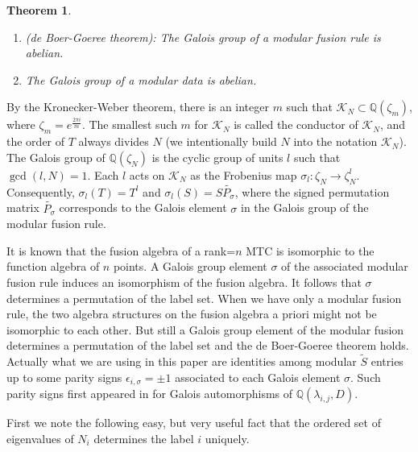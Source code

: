 \documentclass[12pt,psamsfonts]{amsart}
\newcommand{\Q}{\mathbb Q}
\newcommand{\mK}{\mathcal{K}}
\newcommand{\tS}{\tilde{S}}
\numberwithin{equation}{section}
\newtheorem{theorem}{Theorem}[section]
\theoremstyle{definition}
\begin{document}
\begin{theorem}\label{deboergoereetheorem}

\begin{enumerate}
\item (de Boer-Goeree theorem): The Galois group of a modular
fusion rule is abelian.

\item The Galois group of a modular data is abelian.
\end{enumerate}
\end{theorem}

By the Kronecker-Weber theorem, there is an integer $m$ such that
$\mK_N\subset \Q(\zeta_m)$, where $\zeta_m=e^{\frac{2\pi i}{m}}$.
The smallest such $m$ for $\mK_N$ is called the conductor of
$\mK_N$, and the order of $T$ always divides $N$ (we intentionally
build $N$ into the notation $\mK_N$). The Galois group of
$\Q(\zeta_N)$ is the cyclic group of units $l$ such that
$\gcd(l,N)=1$.  Each $l$ acts on $\mK_N$ as the Frobenius map
$\sigma_l: \zeta_N\rightarrow \zeta_N^l$. Consequently,
$\sigma_l(T)=T^l$ and $\sigma_l(S)=S\tilde{P_{\sigma}}$, where the
signed permutation matrix $\tilde{P_\sigma}$ corresponds to the
Galois element $\sigma$ in the Galois group of the modular fusion
rule.

It is known that the fusion algebra of a rank=$n$ MTC is
isomorphic to the function algebra of $n$ points.  A Galois group
element $\sigma$ of the associated modular fusion rule induces an
isomorphism of the fusion algebra.  It follows that $\sigma$
determines a permutation of the label set.  When we have only a
modular fusion rule, the two algebra structures on the fusion
algebra a priori might not be isomorphic to each other. But still
a Galois group element of the modular fusion determines a
permutation of the label set and the de Boer-Goeree theorem holds.
Actually what we are using in this paper are identities among
modular $\tS$ entries up to some parity signs
$\epsilon_{i,\sigma}=\pm 1$ associated to each Galois element
$\sigma$.  Such parity signs first appeared in \cite{CG} for
Galois automorphisms of $\Q(\lambda_{i,j},D)$. 

First we note the following easy, but very useful fact that the
ordered set of eigenvalues of $N_i$ determines the label $i$
uniquely.
\end{document}
